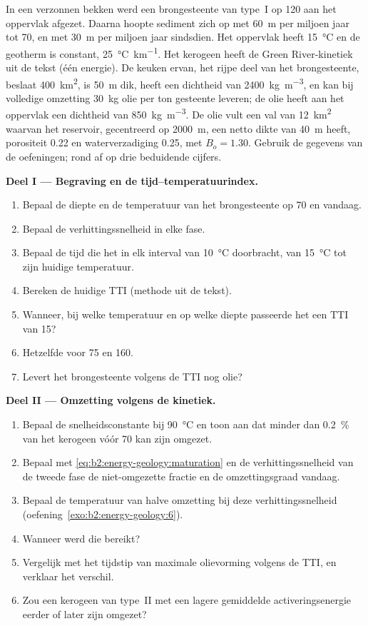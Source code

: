 \begin{problem}\label{pb:b2:energy-geology:1}
In een verzonnen bekken werd een brongesteente van type~I op \qty{120}{\Ma} aan het oppervlak afgezet.
Daarna hoopte sediment zich op met \qty{60}{m} per miljoen jaar tot \qty{70}{\Ma}, en met \qty{30}{m}
per miljoen jaar sindsdien. Het oppervlak heeft \qty{15}{\celsius} en de geotherm is constant,
\qty{25}{\celsius\per\km}. Het kerogeen heeft de Green River-kinetiek uit de tekst (één energie).
De keuken ervan, het rijpe deel van het brongesteente, beslaat \qty{400}{km^2}, is \qty{50}{m} dik,
heeft een dichtheid van \qty{2400}{kg.m^{-3}}, en kan bij volledige omzetting \qty{30}{kg} olie per ton gesteente
leveren; de olie heeft aan het oppervlak een dichtheid van \qty{850}{kg.m^{-3}}. De olie vult een val van
\qty{12}{km^2} waarvan het reservoir, gecentreerd op \qty{2000}{m}, een netto dikte van \qty{40}{m} heeft,
porositeit 0.22 en waterverzadiging 0.25, met $B_o = 1.30$. Gebruik de gegevens van de oefeningen; rond af op
drie beduidende cijfers.

\noindent\textbf{Deel I --- Begraving en de tijd--temperatuurindex.}
\begin{enumerate}
  \item Bepaal de diepte en de temperatuur van het brongesteente op \qty{70}{\Ma} en vandaag.
  \item Bepaal de verhittingssnelheid in elke fase.
  \item Bepaal de tijd die het in elk interval van \qty{10}{\celsius} doorbracht, van \qty{15}{\celsius} tot
        zijn huidige temperatuur.
  \item Bereken de huidige TTI (methode uit de tekst).
  \item Wanneer, bij welke temperatuur en op welke diepte passeerde het een TTI van 15?
  \item Hetzelfde voor 75 en 160.
  \item Levert het brongesteente volgens de TTI nog olie?
\end{enumerate}

\noindent\textbf{Deel II --- Omzetting volgens de kinetiek.}
\begin{enumerate}[resume]
  \item Bepaal de snelheidsconstante bij \qty{90}{\celsius} en toon aan dat minder dan \qty{0.2}{\percent} van
        het kerogeen vóór \qty{70}{\Ma} kan zijn omgezet.
  \item Bepaal met \eqref{eq:b2:energy-geology:maturation} en de verhittingssnelheid van de tweede fase
        de niet-omgezette fractie en de omzettingsgraad vandaag.
  \item Bepaal de temperatuur van halve omzetting bij deze verhittingssnelheid (oefening~\ref{exo:b2:energy-geology:6}).
  \item Wanneer werd die bereikt?
  \item Vergelijk met het tijdstip van maximale olievorming volgens de TTI, en verklaar het verschil.
  \item Zou een kerogeen van type~II met een lagere gemiddelde activeringsenergie eerder of later zijn omgezet?
\end{enumerate}


\end{problem}
